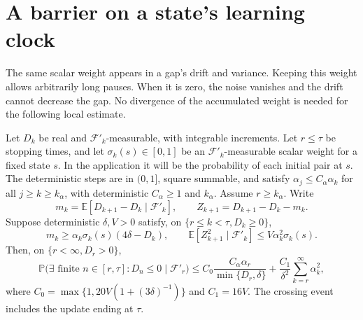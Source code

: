 \section{A barrier on a state's learning clock}
The same scalar weight appears in a gap's drift and variance. Keeping this weight allows arbitrarily long pauses. When it is zero, the noise vanishes and the drift cannot decrease the gap. No divergence of the accumulated weight is needed for the following local estimate.

\begin{lemma}\label{lem:barrier}
Let $D_k$ be real and $\mathcal F'_k$-measurable, with integrable increments. Let $r\le\tau$ be stopping times, and let $\sigma_k(s)\in[0,1]$ be an $\mathcal F'_k$-measurable scalar weight for a fixed state $s$. In the application it will be the probability of each initial pair at $s$. The deterministic steps are in $(0,1]$, square summable, and satisfy $\alpha_j\le C_\alpha\alpha_k$ for all $j\ge k\ge k_\alpha$, with deterministic $C_\alpha\ge1$ and $k_\alpha$. Assume $r\ge k_\alpha$. Write
\[
m_k=\mathbb E[D_{k+1}-D_k\mid\mathcal F'_k],\qquad
Z_{k+1}=D_{k+1}-D_k-m_k.
\]
Suppose deterministic $\delta,V>0$ satisfy, on $\{r\le k<\tau,D_k\ge0\}$,
\begin{equation}\label{eq:barrierhyp}
m_k\ge\alpha_k\sigma_k(s)(4\delta-D_k),\qquad
\mathbb E[Z_{k+1}^2\mid\mathcal F'_k]\le V\alpha_k^2\sigma_k(s).
\end{equation}
Then, on $\{r<\infty,D_r>0\}$,
\begin{equation}\label{eq:barrier}
\mathbb P\bigl(\exists\text{ finite }n\in[r,\tau]:D_n\le0\mid\mathcal F'_r\bigr)
\le C_0\frac{C_\alpha\alpha_r}{\min\{D_r,\delta\}}+\frac{C_1}{\delta^2}\sum_{k=r}^{\infty}\alpha_k^2,
\end{equation}
where $C_0=\max\{1,20V(1+(3\delta)^{-1})\}$ and $C_1=16V$. The crossing event includes the update
ending at $\tau$.
\end{lemma}
